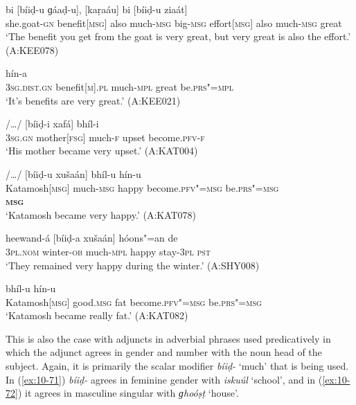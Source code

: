 \begin{exe}
\ex
\label{ex:10-65}
\gll [čhéel"=ii phaaidá] bi [bíiḍ-u ɡáaḍ-u], [kaṛaáu] bi [bíiḍ-u ziaát] \\
she.goat-\textsc{gn} benefit[\textsc{msg}] also much-\textsc{msg} big-\textsc{msg}  effort[\textsc{msg}] also much-\textsc{msg} great \\
\glt `The benefit you get from the goat is very great, but very great is also the effort.' (A:KEE078)

\ex
\label{ex:10-66}
 hín-a \\
\textsc{3sg}.\textsc{dist.gn} benefit[\textsc{m}].\textsc{pl} much-\textsc{mpl} great  be.\textsc{prs"=mpl} \\
\glt `It's benefits are very great.' (A:KEE021)

\ex
\label{ex:10-67}
 /{\ldots}/ [bíiḍ-i xafá] bhíl-i \\
\textsc{3sg.gn} mother[\textsc{fsg}] {} much-\textsc{f} upset become.\textsc{pfv-f} \\
\glt `His mother became very upset.' (A:KAT004)

\ex
\label{ex:10-68}
\glll [kaṭamúš] /{\ldots}/ [bíiḍ-u xušaán] bhíl-u hín-u \\
Katamosh[\textsc{msg}] {} much-\textsc{msg} happy become.\textsc{pfv"=msg} be.\textsc{prs"=msg}  \\
\textbf{\textsc{msg}} \\
\glt `Katamosh became very happy.' (A:KAT078)

\ex
\label{ex:10-69}
\gll [se] heewand-á [bíiḍ-a xušaán] hóons"=an de \\
\textsc{3pl.nom} winter-\textsc{ob} much-\textsc{mpl} happy stay-\textsc{3pl} \textsc{pst} \\
\glt `They remained very happy during the winter.' (A:SHY008)

\ex
\label{ex:10-70}
 bhíl-u hín-u \\
Katamosh[\textsc{msg}] good.\textsc{msg} fat become.\textsc{pfv"=msg}  be.\textsc{prs"=msg} \\
\glt `Katamosh became really fat.' (A:KAT082)
\end{exe}

This is also the case with adjuncts in adverbial phrases used predicatively in which the adjunct agrees in gender and number with the noun head of the subject. Again, it is primarily the scalar modifier \textit{bíiḍ-} `much' that is being used. In (\ref{ex:10-71}) \textit{bíiḍ-} agrees in feminine gender with \textit{iskuúl} `school', and in (\ref{ex:10-72}) it agrees in masculine singular with \textit{ɡhoóṣṭ} `house'. 

